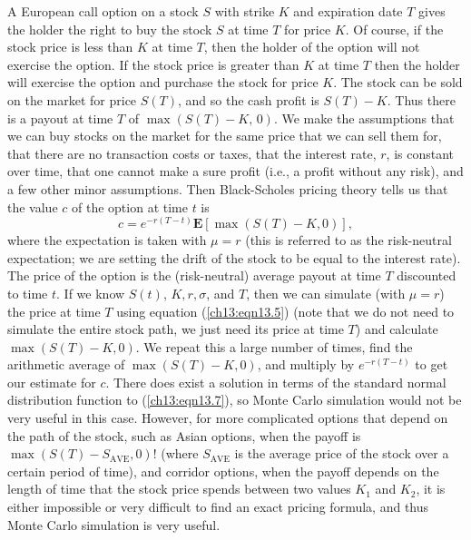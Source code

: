 \documentclass{stml-l}
\theoremstyle{definition}
\numberwithin{equation}{chapter}
\numberwithin{figure}{chapter}
\numberwithin{figure}{section}
\begin{document}
A European call option on a stock $S$ with strike $K$ and expiration date $T$ gives the holder the right to buy the stock $S$ at time $T$ for price $K$. Of course, if the stock price is less than $K$ at time $T$, then the holder of the option will not exercise the option. If the stock price is greater than $K$ at time $T$ then the holder will exercise the option and purchase the stock for price $K$. The stock can be sold on the market for price $S(T)$, and so the cash profit is $S(T)-K$. Thus there is a payout at time $T$ of $\displaystyle \max(S(T)-K,\,0)$. We make the assumptions that we can buy stocks on the market for the same price that we can sell them for, that there are no transaction costs or taxes, that the interest rate, $r$, is constant over time, that one cannot make a sure profit (i.e., a profit without any risk), and a few other minor assumptions. Then Black-Scholes pricing theory tells us that the value $c$ of the option at time $t$ is
\begin{equation}
\label{ch13:eqn13.7}c=e^{-r(T-t)}\mathbf{E}[\max(S(T)-K,0)],
\end{equation}
where the expectation is taken with $\mu=r$ (this is referred to as the risk-neutral expectation; we are setting the drift of the stock to be equal to the interest rate). The price of the option is the (risk-neutral) average payout at time $T$ discounted to time $t$. If we know $S(t)$, $K,r,\sigma$, and $T$, then we can simulate (with $\mu=r$) the price at time $T$ using equation (\ref{ch13:eqn13.5}) (note that we do not need to simulate the entire stock path, we just need its price at time $T$) and calculate $\displaystyle \max(S(T)-K,0)$. We repeat this a large number of times, find the arithmetic average of $\displaystyle \max(S(T)-K,0)$, and multiply by $e^{-r(T-t)}$ to get our estimate for $c$. There does exist a solution in terms of the standard normal distribution function to (\ref{ch13:eqn13.7}), so Monte Carlo simulation would not be very useful in this case. However, for more complicated options that depend on the path of the stock, such as Asian options, when the payoff is $\displaystyle \max(S(T)-S_{\mathrm{AVE}},0)!$ (where $S_{\mathrm{AVE}}$ is the average price of the stock over a certain period of time), and corridor options, when the payoff depends on the length of time that the stock price spends between two values $K_{1}$ and $K_{2}$, it is either impossible or very difficult to find an exact pricing formula, and thus Monte Carlo simulation is very useful.

\end{document}
